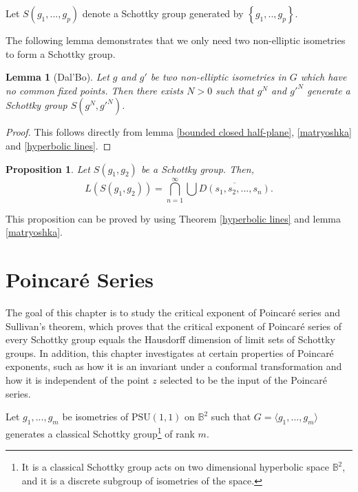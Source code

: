 \documentclass[12pt,oneside]{sfsuthesis}
\theoremstyle{plain} %
\newtheorem{lemma}[theorem]{Lemma}
\newtheorem{proposition}[theorem]{Proposition}
\theoremstyle{definition}  %
\theoremstyle{remark}  %
\theoremstyle{plain}
\begin{document}
{ 




Let $S(g_1,...,g_p)$ denote a Schottky group generated by $\left\lbrace g_1,..,g_p\right\rbrace$. 

The following lemma demonstrates that we only need two non-elliptic isometries to form a Schottky group.




\begin{lemma}[Dal'Bo]\label{schottky}
Let $g$ and $g'$ be two non-elliptic isometries in $G$ which have no common fixed points. Then there exists $N>0$ such that $g^{N}$ and $g'^{N}$ generate a Schottky group $S(g^{N},g'^{N})$.
\end{lemma}
\begin{proof}
This follows directly from lemma \ref{bounded closed half-plane}, \ref{matryoshka} and \ref{hyperbolic lines}.
\end{proof}


\begin{proposition}
Let $S(g_1,g_2)$ be a Schottky group.
Then, $$L(S(g_1,g_2))=\bigcap_{n=1}^\infty \bigcup \overline{D(s_1,s_2,...,s_n)}.$$
\end{proposition}
This proposition can be proved by using Theorem \ref{hyperbolic lines} and lemma \ref{matryoshka}.


\chapter{Poincar\'{e} Series}\label{PoincareSeries}


The goal of this chapter is to study the critical exponent of Poincar\'{e} series and Sullivan's theorem, which proves that the critical exponent of Poincar\'{e} series of every Schottky group equals the Hausdorff dimension of limit sets of Schottky groups. In addition, this chapter investigates at certain properties of Poincar\'{e} exponents, such as how it is an invariant under a conformal transformation and how it is independent of the point $z$ selected to be the input of the Poincar\'{e} series.


Let $g_1,...,g_m$ be isometries of $\text{PSU}(1,1)$ on ${\mathbb B}^2$ such that $G = \langle g_1,...,g_m\rangle$ generates a classical Schottky group\footnote{It is a classical Schottky group acts on two dimensional hyperbolic space $\mathbb{B}^2$, and it is a discrete subgroup of isometries of the space.} of rank $m$. 

}
\end{document}
